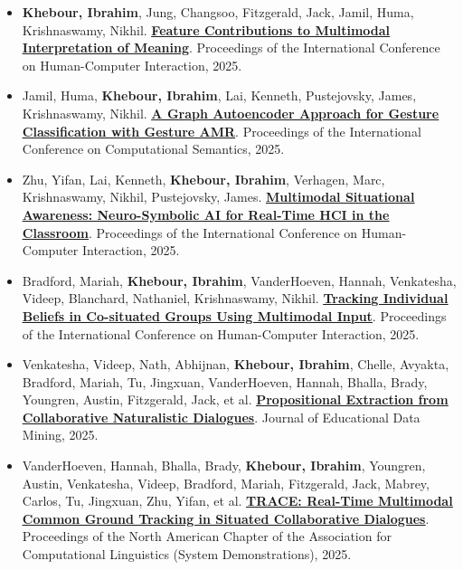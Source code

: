 \documentclass[letterpaper,11pt]{article}
\newcommand{\pubtitle}[2]{\href{#1}{\textbf{\ul{#2}}}}
\begin{document}
\begin{itemize}

\item \textbf{Khebour, Ibrahim}, Jung, Changsoo, Fitzgerald, Jack, Jamil, Huma, Krishnaswamy, Nikhil. 
\pubtitle{https://par.nsf.gov/servlets/purl/10586880}{Feature Contributions to Multimodal Interpretation of Meaning}. 
Proceedings of the International Conference on Human-Computer Interaction, 2025.

\item Jamil, Huma, \textbf{Khebour, Ibrahim}, Lai, Kenneth, Pustejovsky, James, Krishnaswamy, Nikhil. 
\pubtitle{https://aclanthology.org/2025.iwcs-main.4.pdf}{A Graph Autoencoder Approach for Gesture Classification with Gesture AMR}. 
Proceedings of the International Conference on Computational Semantics, 2025.

\item Zhu, Yifan, Lai, Kenneth, \textbf{Khebour, Ibrahim}, Verhagen, Marc, Krishnaswamy, Nikhil, Pustejovsky, James. 
\pubtitle{https://link.springer.com/chapter/10.1007/978-3-031-94153-5_45}{Multimodal Situational Awareness: Neuro-Symbolic AI for Real-Time HCI in the Classroom}. 
Proceedings of the International Conference on Human-Computer Interaction, 2025.

\item Bradford, Mariah, \textbf{Khebour, Ibrahim}, VanderHoeven, Hannah, Venkatesha, Videep, Blanchard, Nathaniel, Krishnaswamy, Nikhil. 
\pubtitle{https://link.springer.com/content/pdf/10.1007/978-3-031-93412-4_8.pdf}{Tracking Individual Beliefs in Co-situated Groups Using Multimodal Input}. 
Proceedings of the International Conference on Human-Computer Interaction, 2025.

\item Venkatesha, Videep, Nath, Abhijnan, \textbf{Khebour, Ibrahim}, Chelle, Avyakta, Bradford, Mariah, Tu, Jingxuan, VanderHoeven, Hannah, Bhalla, Brady, Youngren, Austin, Fitzgerald, Jack, et al. 
\pubtitle{https://par.nsf.gov/servlets/purl/10588539}{Propositional Extraction from Collaborative Naturalistic Dialogues}. 
Journal of Educational Data Mining, 2025.

\item VanderHoeven, Hannah, Bhalla, Brady, \textbf{Khebour, Ibrahim}, Youngren, Austin, Venkatesha, Videep, Bradford, Mariah, Fitzgerald, Jack, Mabrey, Carlos, Tu, Jingxuan, Zhu, Yifan, et al. 
\pubtitle{https://aclanthology.org/2025.naacl-demo.5.pdf}{TRACE: Real-Time Multimodal Common Ground Tracking in Situated Collaborative Dialogues}. 
Proceedings of the North American Chapter of the Association for Computational Linguistics (System Demonstrations), 2025.


\end{itemize}
\end{document}
